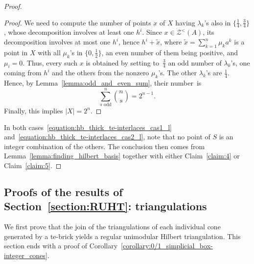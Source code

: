 \documentclass[11pt,a4paper]{amsart}
\theoremstyle{plain}
\theoremstyle{definition}
\newcommand{\cal}[1]{\mathcal{#1}}
\renewcommand{\cal}[1]{\mathcal{#1}}
\begin{document}
\begin{proof}
\begin{itemize}
\begin{proof}
	We need to compute the number of points $x$ of $X$ having $\lambda_k$'s also in $\{\frac{1}{4},\frac{3}{4}\}$, whose decomposition involves at least one $h^i$.
	Since $x\in\cal Z^<(A)$, its decomposition involves at most one $h^i$, hence $h^i+\tilde{x}$, where $\tilde{x}=\sum_{k=1}^n \mu_k a^k$ is a point in $X$ with all $\mu_k$'s in $\{0,\frac{1}{2}\}$, an even number of them being positive, and $\mu_i=0$. Thus, every such $x$ is obtained by setting to~$\frac34$ an odd number of $\lambda_k$'s, one coming from $h^i$ and the others from the nonzero $\mu_k$'s. The other $\lambda_k$'s are $\frac{1}{4}$.
	Hence, by Lemma~\ref{lemma:odd_and_even_sum}, their number~is
	$$\sum_{s\text{ odd}}^n \binom{n}{s}= 2^{n-1}.$$ 
	Finally, this implies $|X| = 2^{n}$.	
	\end{proof}
	\end{itemize}
	In both cases~\ref{equation:hb_thick_te-interlaces_cas1_l} and~\ref{equation:hb_thick_te-interlaces_cas2_l}, note that no point of $S$ is an integer combination of the others.
	The conclusion then comes from Lemma~\ref{lemma:finding_hilbert_basis} together with either Claim~\ref{claim:4} or Claim~\ref{claim:5}.
	\end{proof}

\subsection{Proofs of the results of Section~\ref{section:RUHT}{: triangulations}}{We first prove that the join of the triangulations of each individual cone generated by a te-brick yields a regular unimodular Hilbert triangulation.}
This section ends with a proof of Corollary~\ref{corollary:0/1_simplicial_box-integer_cones}.
\end{document}
